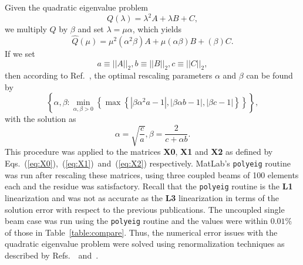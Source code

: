 Given the quadratic eigenvalue problem
\begin{equation}
Q(\lambda) = \lambda^2A+\lambda B+C,
\end{equation} 
we multiply $Q$ by $\beta$ and set $\lambda = \mu\alpha$, which yields
\begin{equation}
\hat Q(\mu) = \mu^2(\alpha^2\beta)A+\mu(\alpha\beta)B+(\beta)C.
\end{equation}
If we set
\begin{equation}
a\equiv||A||_2,b\equiv||B||_2,c\equiv||C||_2,
\end{equation}
then according to Ref.~\cite{fan2004normwise}, the optimal rescaling parameters $\alpha$ and $\beta$ can be found by
\begin{equation}
\left\{\alpha,\beta:\min_{\alpha,\beta>0}\left\{\max\left\{\left|\beta\alpha^2a-1\right|,\left|\beta\alpha b-1\right|,\left|\beta c-1\right|\right\}\right\}\right\},
\end{equation}
with the solution as
\begin{equation}
\alpha=\sqrt{\frac{c}{a}},\beta=\frac{2}{c+\alpha b}.
\end{equation}
This procedure was applied to the matrices \textbf{X0}, \textbf{X1} and \textbf{X2} as defined by Eqs.~(\ref{eq:X0}),~(\ref{eq:X1})~and~(\ref{eq:X2}) respectively. MatLab's \texttt{polyeig} routine was run after rescaling these matrices, using three coupled beams of 100 elements each and the residue was satisfactory. Recall that the \texttt{polyeig} routine is the \textbf{L1} linearization and was not as accurate as the \textbf{L3} linearization in terms of the solution error with respect to the previous publications. The uncoupled single beam case was run using the \texttt{polyeig} routine and the values were within $0.01\%$ of those in Table~\ref{table:compare}. Thus, the numerical error issues with the quadratic eigenvalue problem were solved using renormalization techniques as described by Refs.~\cite{betcke2008optimal}~and~\cite{fan2004normwise}.

